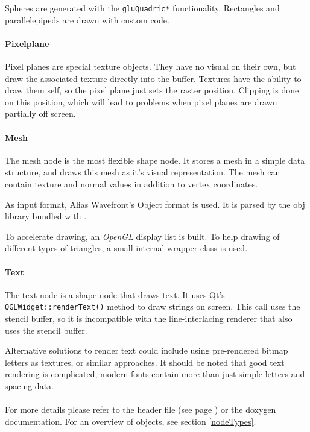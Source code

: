 Spheres are generated with the \lstinline{gluQuadric*} functionality.
Rectangles and parallelepipeds are drawn with custom code.

\paragraph{Pixelplane}
Pixel planes are special texture objects.
They have no visual on their own, but draw the associated texture directly into the buffer.
Textures have the ability to draw them self, so the pixel plane just sets the raster position.
Clipping is done on this position, which will lead to problems when pixel planes are drawn partially off screen.

\paragraph{Mesh}
The mesh node is the most flexible shape node.
It stores a mesh in a simple data structure, and draws this mesh as it's visual representation.
The mesh can contain texture and normal values in addition to vertex coordinates.

As input format, Alias Wavefront's Object format is used.
It is parsed by the obj library bundled with \ER.

To accelerate drawing, an \textit{OpenGL} display list is built.
To help drawing of different types of triangles, a small internal wrapper class is used.

\paragraph{Text}
The text node is a shape node that draws text.
It uses Qt's \lstinline{QGLWidget::renderText()} method to draw strings on screen.
This call uses the stencil buffer, so it is incompatible with the line-interlacing renderer that also uses the stencil buffer.

Alternative solutions to render text could include using pre-rendered bitmap letters as textures, or similar approaches.
It should be noted that good text rendering is complicated, modern fonts contain more than just simple letters and spacing data.

\paragraph{}
For more details please refer to the header file (see page \pageref{object.h}) or the doxygen documentation.
For an overview of objects, see section \ref{nodeTypes}.


